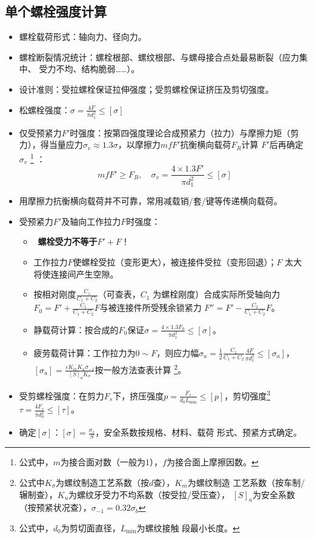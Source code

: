\documentclass[12pt,a4paper]{article}
\newcommand{\tightlist}{\setlength{\parskip}{0pt}\setlength{\itemsep}{0pt}}
\newcommand{\hint}[1]{\textsf{（#1）}}
\newcommand{\minor}[1]{{\color{gray} #1}}
\renewcommand{\emph}[1]{\faIcon[regular]{lightbulb}\ \textbf{#1}}
\begin{document}
\subsection{单个螺栓强度计算}
\begin{itemize}\tightlist
    \item 螺栓载荷形式：轴向力、径向力。
    \item 螺栓断裂情况统计：螺栓根部、螺纹根部、与螺母接合点处最易断裂\hint{应力集中、
    受力不均、结构脆弱……}。
    \item 设计准则：受拉螺栓保证拉伸强度；受剪螺栓保证挤压及剪切强度。
    \item 松螺栓强度：$\sigma=\frac{4F}{\pi d_1^2}\leq[\sigma]$
    \item 仅受预紧力$F'$时强度：按第四强度理论合成预紧力\hint{拉力}与摩擦力矩\hint{剪
    力}，得当量应力$\sigma_v\approx1.3\sigma$，以摩擦力$mfF'$抗衡横向载荷$F_R$计算
    $F'$后再确定$\sigma_v$
    \footnote{公式中，$m$为接合面对数（一般为1），$f$为接合面上摩擦因数。}
    ：
    \begin{equation}
    mfF'\geq F_R,\quad\sigma_v=\frac{4\times1.3F'}{\pi d_1^2}\leq[\sigma]
    \end{equation}
    \item \minor{用摩擦力抗衡横向载荷并不可靠，常用减载销/套/键等传递横向载荷。}
    \item 受预紧力$F'$及轴向工作拉力$F$时强度：
    \begin{itemize}\tightlist
        \item \emph{螺栓受力不等于$F'+F$}！
        \item 工作拉力$F$使螺栓受拉\hint{变形更大}，被连接件受拉\hint{变形回退}；$F$
        太大将使连接间产生空隙。
        \item 按相对刚度$\frac{C_1}{C_1+C_2}$\hint{可查表，$C_1$ 为螺栓刚度}合成实际所受轴向力$F_0=
        F'+\frac{C_1}{C_1+C_2}F$与被连接件所受残余锁紧力
        $F''=F'-\frac{C_2}{C_1+C_2}F$。
        \item 静载荷计算：按合成的$F_0$保证$\sigma=\frac{4\times1.3F_0}{\pi d_1^2}
        \leq[\sigma]$。
        \item 疲劳载荷计算：工作拉力为$0\sim F$，则应力幅$\sigma_a=\frac12
        \frac{C_1}{C_1+C_2}\frac{4F}{\pi d_1^2}\leq[\sigma_a]$，$[\sigma_a]=
        \frac{\varepsilon K_mK_u\sigma_{-1}}{[S]_aK_\sigma}$按一般方法查表计算
        \footnote{公式中$K_\sigma$为螺纹制造工艺系数\hint{按$d$查}，$K_m$为螺纹制造
        工艺系数\hint{按车制/辗制查}，$K_u$为螺纹牙受力不均系数\hint{按受拉/受压查}，
        $[S]_a$为安全系数\hint{按预紧状况查}，$\sigma_{-1}=0.32\sigma_b$}。
    \end{itemize}
    \item 受剪螺栓强度：在剪力$F_s$下，挤压强度$p=\frac{F_s}{d_0L_{\text{min}}}
    \leq[p]$，剪切强度\footnote{公式中，$d_0$为剪切面直径，$L_\text{min}$为螺纹接触
    段最小长度。}$\tau=\frac{4F_s}{\pi d_0^2}\leq[\tau]$。
    \item 确定$[\sigma]$：$[\sigma]=\frac{\sigma_s}{S}$，安全系数按规格、材料、载荷
    形式、预紧方式确定。
\end{itemize}
\end{document}
